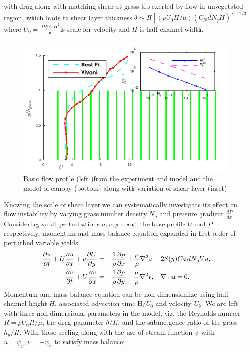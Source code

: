 \documentclass[aps,prl,twocolumn,showpacs,superscriptaddress,groupedaddress,10pt]{revtex4-1}  %
\newcommand{\bu}{\mathbf{u}}
\newcommand{\del}{\partial}
\begin{document}
with drag along with matching shear at grass tip exerted by flow in unvegetated region, which leads to shear layer 
thickness $\delta \sim  H\left[({\rho U_0 H}/\mu) (C_N d N_g H)\right]^{-1/3}$\normalsize where \small$U_0 = \frac{dP/dxH^2}{\mu}$\normalsize is scale for velocity and
$H$ is half channel width.
\begin{figure}[htb]
  \includegraphics[scale=1]{Grass_Base_Vivoni_shear}
\caption{Basic flow profile (left )from the experiment and model and the model of canopy (bottom) along with variation of shear layer (inset) }
\label{fig:basicflow}
\end{figure}
\newline
Knowing the scale of shear layer we can systematically investigate its effect on flow instability
by varying grass number density $N_g$ and pressure gradient $\frac{dP}{dx}$. Considering small perturbations $u, v, p$ about the base profile $U$ and $P$
respectively, momentum and mass balance equation expanded in first order of perturbed variable yields
\begin{equation}
\begin{split}
\frac{\del u}{\del t}+U\frac{\del u}{\del x}+v\frac{\del U}{\del y} &= -\frac{1}{\rho}\frac{\del p}{\del x}+\frac{\mu}{\rho}\nabla^2u-2S(y) C_{N}dN_{g}Uu, \\
\frac{\del v}{\del  t}+ U\frac{\del v}{\del x} &= -\frac{1}{\rho}\frac{\del p}{\del y}+\frac{\mu}{\rho}\nabla^2v, \hspace{0.3cm} \nabla\cdot\bu=0.
\end{split}
\end{equation}
Momentum and mass balance equation can be non-dimensionlize using half channel height $H$, associated advection time H/$U_0$ and velocity $U_0$. We are left with three non-dimensional parameters in the model, viz. the Reynolds number $R= {\rho U_0 H}/{\mu}$, the drag parameter $\delta/H$, and the submergence ratio of the grass $h_g/H$. With these scaling along with the use of stream function $\psi$ with $u = \psi_{y}, v= -\psi_x$ to satisfy mass balance; 
\end{document}
